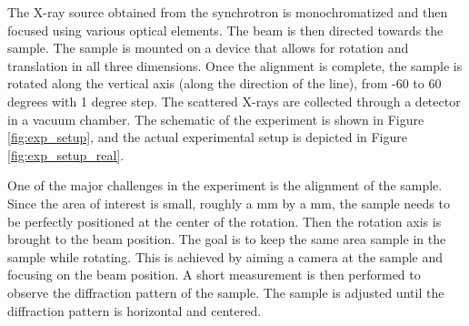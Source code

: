 The X-ray source obtained from the synchrotron is monochromatized and then focused using
various optical elements. The beam is then directed towards the sample. The 
sample is mounted on a device that allows for rotation and translation in all 
three dimensions. Once the alignment is complete, the sample is rotated along the vertical axis (along the direction of the line), from -60
to 60 degrees with 1 degree step. The scattered X-rays are collected through a detector in a 
vacuum chamber. The schematic of the experiment is shown in Figure \ref{fig:exp_setup},
and the actual experimental setup is depicted in Figure \ref{fig:exp_setup_real}.

\medskip

One of the major challenges in the experiment is the alignment of the sample. Since the area of interest is small, roughly a mm by a mm,
the sample needs to be perfectly positioned at the center of the rotation. Then the rotation axis is brought to the beam position. 
The goal is to keep the same area sample in the sample while rotating. This is achieved by 
aiming a camera at the sample and focusing on the beam position. A short measurement is then performed to observe the diffraction pattern of the sample.
The sample is adjusted until the diffraction pattern is horizontal and centered.

